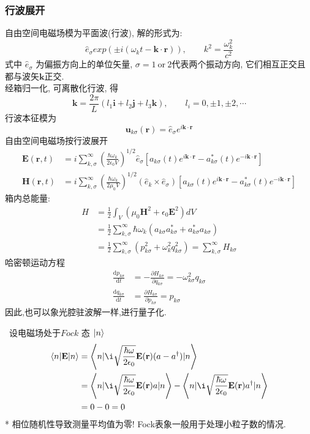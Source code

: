 \subsubsection{行波展开}
自由空间电磁场模为平面波(行波), 解的形式为:
\[  \hat{e}_\sigma exp (\pm i (\omega_k t - \mathbf{k}\cdot \mathbf{r})), \qquad k^2 =\frac{\omega_k ^2}{c^2} \]
式中 $\hat{e}_\sigma $ 为偏振方向上的单位矢量, $\sigma=1 ~\text{or} ~2$代表两个振动方向, 它们相互正交且都与波矢$\mathbf{k}$正交. \\ \vspace*{1em} 
经箱归一化, 可离散化行波, 得 
\[ \mathbf{k} = \frac{2\pi}{L} (l_1 \mathbf{i} + l_2 \mathbf{j}+ l_3 \mathbf{k}), \qquad l_i= 0, \pm 1, \pm 2, \cdots \]
行波本征模为
\[ \mathbf{u}_{k\sigma} (\mathbf{r}) = \hat{e}_\sigma e^{i \mathbf{k}\cdot \mathbf{r}}\]
自由空间电磁场按行波展开
\[   \begin{aligned}
  \mathbf{E} (\mathbf{r},t) &=i \sum^\infty _{k,\sigma} (\frac{\hbar\omega_k}{2 \epsilon_0 V } )^{1/2} \hat{e}_\sigma [ a_{k\sigma} (t) e^{i \mathbf{k}\cdot \mathbf{r}} - a ^* _{k\sigma} (t)  e^{-i \mathbf{k}\cdot \mathbf{r}}] \\
\mathbf{H} (\mathbf{r},t) &=i \sum^\infty _{k,\sigma} (\frac{\hbar\omega_k}{2 \mu_0 V } )^{1/2} (\hat{e}_k \times \hat{e}_\sigma) [ a_{k\sigma} (t) e^{i \mathbf{k}\cdot \mathbf{r}} - a ^* _{k\sigma} (t)  e^{-i \mathbf{k}\cdot \mathbf{r}}] 
\end{aligned} 
\]
箱内总能量:
\[ \begin{aligned}
  H &= \frac{1}{2} \int_V (\mu_0 \mathbf{H}^2 + \epsilon_0 \mathbf{E}^2) dV \\ 
  &= \frac{1}{2}\sum^\infty _{k,\sigma} \hbar \omega_k (a_{k\sigma} a_{k\sigma} ^* + a_{k\sigma} ^*a_{k\sigma} )   \\ 
  &= \frac{1}{2}\sum^\infty _{k,\sigma} (p_{k\sigma} ^2 + \omega_k ^2 q_{k\sigma} ^2 )  = \sum^\infty _{k,\sigma} H_{k\sigma}
\end{aligned} 
\] 
哈密顿运动方程
\[ \begin{aligned}
    \frac{\mathrm{d}p_{k\sigma}}{\mathrm{d}t} &= - \frac{\partial H_{k\sigma}}{\partial q_{k\sigma}} = - \omega ^2 _{k\sigma} q_{k\sigma} \\ 
    \frac{\mathrm{d}q_{k\sigma}}{\mathrm{d}t} &= \frac{\partial H_{k\sigma}}{\partial p_{k\sigma}} =p_{k\sigma}
 \end{aligned} 
\] 
因此,也可以象光腔驻波解一样,进行量子化.

    \证~设电磁场处于$Fock$ 态 $\left|n\right\rangle$
    \[ 
      \begin{aligned}
        \lcr{n}{\mathbf{E}}{n} &= \lcr{n}{\i \sqrt{\frac{\hbar\omega}{2 \epsilon_0}} \mathbf{E}( \mathbf{r}) (a - a^\dagger) }{n}   \\ 
        &= \lcr{n}{\i \sqrt{\frac{\hbar\omega}{2 \epsilon_0}} \mathbf{E}( \mathbf{r})a }{n} - \lcr{n}{\i \sqrt{\frac{\hbar\omega}{2 \epsilon_0}} \mathbf{E}( \mathbf{r})a^\dagger }{n}  \\ 
        &= 0-0 =0 
      \end{aligned}
      \]   
      * 相位随机性导致测量平均值为零! Fock表象一般用于处理小粒子数的情况.  \\
      
